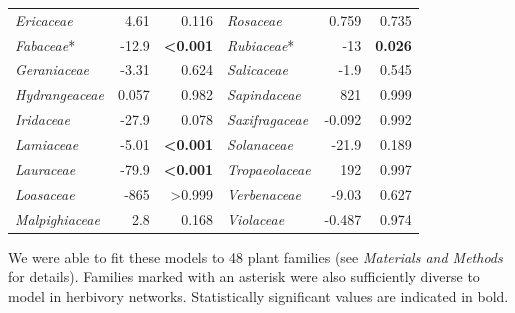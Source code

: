 \documentclass[12pt]{article}
\begin{document}
\begin{table}[!h]
\begin{tabular}{|l  rr|| l rr|}
    \emph{Ericaceae}  & 4.61  & 0.116 & \emph{Rosaceae} & 0.759 & 0.735 \\
    \emph{Fabaceae}*  & -12.9 & \textbf{\textless0.001} & \emph{Rubiaceae}* & -13 & \textbf{0.026}  \\
    \emph{Geraniaceae}  & -3.31 & 0.624 & \emph{Salicaceae} & -1.9  & 0.545 \\
    \emph{Hydrangeaceae}  & 0.057 & 0.982 & \emph{Sapindaceae}  & 821 & 0.999 \\
    \emph{Iridaceae}  & -27.9 & 0.078 & \emph{Saxifragaceae}  & -0.092  & 0.992 \\
    \emph{Lamiaceae}  & -5.01 & \textbf{\textless0.001} & \emph{Solanaceae} & -21.9 & 0.189 \\
    \emph{Lauraceae}  & -79.9 & \textbf{\textless0.001} & \emph{Tropaeolaceae}  & 192 & 0.997 \\
    \emph{Loasaceae}  & -865  & \textgreater0.999 & \emph{Verbenaceae}  & -9.03 & 0.627 \\
    \emph{Malpighiaceae}  & 2.8 & 0.168 & \emph{Violaceae}  & -0.487  & 0.974 \\
  \hline
  \end{tabular}
  \smallskip
  \footnotesize

    We were able to fit these models to 48 plant families (see \emph{Materials and Methods} for details). 
    Families marked with an asterisk were also sufficiently diverse to model in herbivory networks. 
    Statistically significant values are indicated in bold. 

    \end{table}

\clearpage
\end{document}
